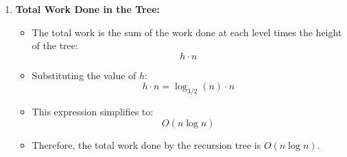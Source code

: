 \begin{example}
\begin{enumerate}
            \item \textbf{Total Work Done in the Tree:}
            \begin{itemize}
                \item The total work is the sum of the work done at each level times the height of the tree:
                \[
                h \cdot n
                \]
                \item Substituting the value of \( h \):
                \[
                h \cdot n = \log_{3/2}(n) \cdot n
                \]
                \item This expression simplifies to:
                \[
                O(n \log n)
                \]
                \item Therefore, the total work done by the recursion tree is \( O(n \log n) \).
            \end{itemize}
        \end{enumerate}
    \end{example}

